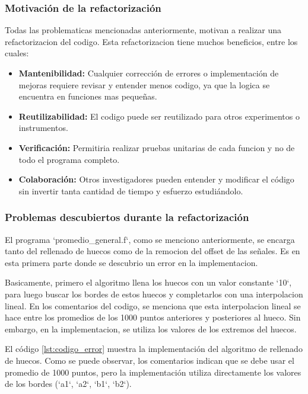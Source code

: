 \documentclass[12pt,a4paper]{article}
\begin{document}
\subsubsection{Motivación de la refactorización}

Todas las problematicas mencionadas anteriormente, motivan a realizar una refactorizacion del codigo. Esta refactorizacion tiene muchos beneficios, entre los cuales:

\begin{itemize}

\item \textbf{Mantenibilidad:} Cualquier corrección de errores o implementación de mejoras requiere revisar y entender menos codigo, ya que la logica se encuentra en funciones mas pequeñas.

\item \textbf{Reutilizabilidad:} El codigo puede ser reutilizado para otros experimentos o instrumentos.

\item \textbf{Verificación:} Permitiria realizar pruebas unitarias de cada funcion y no de todo el programa completo.

\item \textbf{Colaboración:} Otros investigadores pueden entender y modificar el código sin
invertir tanta cantidad de tiempo y esfuerzo estudiándolo.

\end{itemize}

\subsubsection{Problemas descubiertos durante la refactorización}

El programa `promedio\_general.f`, como se menciono anteriormente, se encarga tanto del rellenado de huecos como de la remocion del offset de las señales. Es en esta primera parte donde se descubrio un error en la implementacion.

Basicamente, primero el algoritmo llena los huecos con un valor constante `10`, para luego buscar los bordes de estos huecos y completarlos con una interpolacion lineal. En los comentarios del codigo, se menciona que esta interpolacion lineal se hace entre los promedios de los 1000 puntos anteriores y posteriores al hueco. Sin embargo, en la implementacion, se utiliza los valores de los extremos del huecos.

El código \ref{lst:codigo_error} muestra la implementación del algoritmo de rellenado de huecos. Como se puede observar, los comentarios indican que se debe usar el promedio de 1000 puntos, pero la implementación utiliza directamente los valores de los bordes (`a1`, `a2`, `b1`, `b2`).
\end{document}
